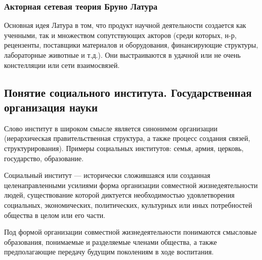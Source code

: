 \subsubsection{Акторная сетевая теория Бруно Латура}

Основная идея Латура в том, что продукт научной деятельности создается как ученными, 
так и множеством сопутствующих акторов (среди которых, н-р, рецензенты, поставщики 
материалов и оборудования, финансирующие структуры, лабораторные животные и т.д.).
Они выстраиваются в удачной или не очень констелляции или сети взаимосвязей. 

\subsection{Понятие социального института. Государственная организация науки} 

Слово институт в широком смысле является синонимом организации (иерархическая правительственная структура, а также процесс создания связей, структурирования).
Примеры социальных институтов: семья, армия, церковь, государство,
образование.

Социальный институт --- исторически сложившаяся или созданная
целенаправленными усилиями форма организации совместной жизнедеятельности людей,
существование которой диктуется необходимостью удовлетворения социальных,
экономических, политических, культурных или иных потребностей общества в целом
или его части.

Под формой организации совместной жизнедеятельности понимаются смысловые
образования, понимаемые и разделяемые членами общества, а также предполагающие
передачу будущим поколениям в ходе воспитания. 




